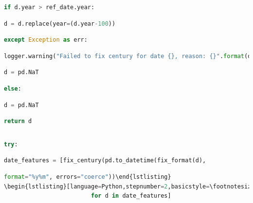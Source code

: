 \documentclass[
  11pt,
  a4paper,
  DIV=12,captions=tableheading,oneside]{scrbook}
\begin{document}
\begin{lstlisting}[language=Python,stepnumber=2,basicstyle=\footnotesize]
                if d.year > ref_date.year:\end{lstlisting}
\begin{lstlisting}[language=Python,stepnumber=2,basicstyle=\footnotesize]
                    d = d.replace(year=(d.year-100))\end{lstlisting}
\begin{lstlisting}[language=Python,stepnumber=2,basicstyle=\footnotesize]
            except Exception as err:\end{lstlisting}
\begin{lstlisting}[language=Python,stepnumber=2,basicstyle=\footnotesize]
                logger.warning("Failed to fix century for date {}, reason: {}".format(d, err))\end{lstlisting}
\begin{lstlisting}[language=Python,stepnumber=2,basicstyle=\footnotesize]
                d = pd.NaT\end{lstlisting}
\begin{lstlisting}[language=Python,stepnumber=2,basicstyle=\footnotesize]
        else:\end{lstlisting}
\begin{lstlisting}[language=Python,stepnumber=2,basicstyle=\footnotesize]
            d = pd.NaT\end{lstlisting}
\begin{lstlisting}[language=Python,stepnumber=2,basicstyle=\footnotesize]
        return d\end{lstlisting}
\begin{lstlisting}[language=Python,stepnumber=2,basicstyle=\footnotesize]
\end{lstlisting}
\begin{lstlisting}[language=Python,stepnumber=2,basicstyle=\footnotesize]
    try:\end{lstlisting}
\begin{lstlisting}[language=Python,stepnumber=2,basicstyle=\footnotesize]
        date_features = [fix_century(pd.to_datetime(fix_format(d),\end{lstlisting}
\begin{lstlisting}[language=Python,stepnumber=2,basicstyle=\footnotesize]
                                     format="%y%m", errors="coerce"))\end{lstlisting}
\begin{lstlisting}[language=Python,stepnumber=2,basicstyle=\footnotesize]
                         for d in date_features]\end{lstlisting}
\end{document}
